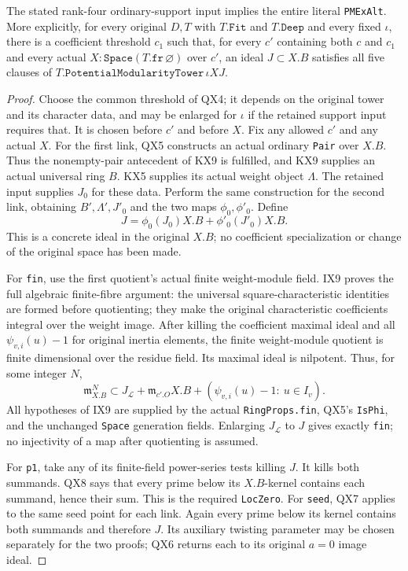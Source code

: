 \begin{theorem}
\label{claim:QX10}
The stated rank-four ordinary-support input implies the entire
literal \texttt{PMExAlt}.  More explicitly, for every original
$D,T$ with $T.\texttt{Fit}$ and $T.\texttt{Deep}$ and every
fixed $\iota$, there is a coefficient threshold $c_1$ such that,
for every $c'$ containing both $c$ and $c_1$ and every actual
$X:\texttt{Space}(T.\texttt{fr}\,\varnothing)$ over $c'$, an
ideal $J\subset X.B$ satisfies all five clauses of
$T.\texttt{PotentialModularityTower}\,\iota XJ$.
\end{theorem}
\begin{proof}
Choose the common threshold of QX4; it depends on the
original tower and its character data, and may be enlarged
for $\iota$ if the retained support input requires that.
It is chosen before $c'$ and before $X$.
Fix any allowed $c'$ and any actual $X$.
For the first link, QX5 constructs an actual ordinary
\texttt{Pair} over $X.B$.  Thus the nonempty-pair
antecedent of KX9 is fulfilled, and KX9 supplies an
actual universal ring $B$.  KX5 supplies its actual
weight object $\Lambda$.
The retained input supplies $J_0$ for these data.
Perform the same construction for the second link,
obtaining $B',\Lambda',J'_0$ and the two maps
$\phi_0,\phi'_0$.  Define
\[
        J=\phi_0(J_0)X.B+\phi'_0(J'_0)X.B.
        \tag{QX.28}
\]
This is a concrete ideal in the original $X.B$;
no coefficient specialization or change of the
original space has been made.

For \texttt{fin}, use the first quotient's actual
finite weight-module field.  IX9 proves the full
algebraic finite-fibre argument: the universal
square-characteristic identities are formed
before quotienting; they make the original
characteristic coefficients integral over the
weight image.  After killing the coefficient
maximal ideal and all
$\psi_{v,i}(u)-1$ for original inertia elements,
the finite weight-module quotient is finite
dimensional over the residue field.  Its
maximal ideal is nilpotent.  Thus, for some
integer $N$,
\[
 \mathfrak m_{X.B}^{N}\subset
 J_{\mathcal L}+\mathfrak m_{c'.O}X.B+
 (\psi_{v,i}(u)-1:\ u\in I_v).
 \tag{QX.29}
\]
All hypotheses of IX9 are supplied by the actual
\texttt{RingProps.fin}, QX5's \texttt{IsPhi},
and the unchanged \texttt{Space} generation
fields.  Enlarging $J_{\mathcal L}$ to $J$
gives exactly \texttt{fin}; no injectivity of
a map after quotienting is assumed.

For \texttt{p1}, take any of its finite-field
power-series tests killing $J$.  It kills both
summands.  QX8 says that every prime below its
$X.B$-kernel contains each summand, hence their
sum.  This is the required \texttt{LocZero}.
For \texttt{seed}, QX7 applies to the same seed
point for each link.  Again every prime below
its kernel contains both summands and therefore
$J$.  Its auxiliary twisting parameter may
be chosen separately for the two proofs; QX6
returns each to its original $a=0$ image ideal.


\end{proof}
